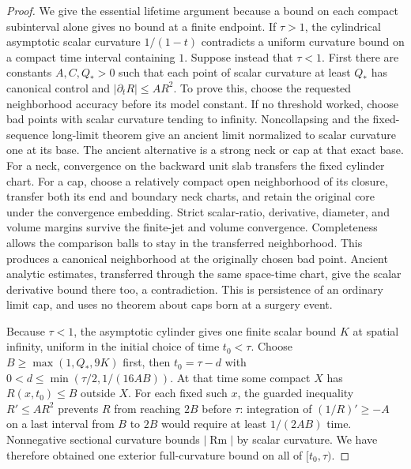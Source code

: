 \begin{proof}
We give the essential lifetime argument because a bound on each compact
subinterval alone gives no bound at a finite endpoint.  If $\tau>1$,
the cylindrical asymptotic scalar curvature $1/(1-t)$ contradicts a
uniform curvature bound on a compact time interval containing $1$.
Suppose instead that $\tau<1$.  First there are constants $A,C,Q_*>0$
such that each point of scalar curvature at least $Q_*$ has canonical
control and $|\partial_tR|\leq AR^2$.  To prove this, choose the
requested neighborhood accuracy before its model constant.  If no
threshold worked, choose bad points with scalar curvature tending to
infinity.  Noncollapsing and the fixed-sequence long-limit theorem
give an ancient limit normalized to scalar curvature one at its base.
The ancient alternative is a strong neck or cap at that exact base.
For a neck, convergence on the backward unit slab transfers the
fixed cylinder chart.  For a cap, choose a relatively compact open
neighborhood of its closure, transfer both its end and boundary
neck charts, and retain the original core under the convergence
embedding.  Strict scalar-ratio, derivative, diameter, and volume
margins survive the finite-jet and volume convergence.  Completeness
allows the comparison balls to stay in the transferred neighborhood.
This produces a canonical neighborhood at the originally chosen
bad point.  Ancient analytic estimates, transferred through the
same space-time chart, give the scalar derivative bound there too,
a contradiction.  This is persistence of an ordinary limit cap,
and uses no theorem about caps born at a surgery event.

Because $\tau<1$, the asymptotic cylinder gives one finite scalar
bound $K$ at spatial infinity, uniform in the initial choice of
time $t_0<\tau$.  Choose $B\geq\max(1,Q_*,9K)$ first, then
$t_0=\tau-d$ with $0<d\leq\min(\tau/2,1/(16AB))$.
At that time some compact $X$ has $R(x,t_0)\leq B$ outside $X$.
For each fixed such $x$, the guarded inequality $R'\leq AR^2$
prevents $R$ from reaching $2B$ before $\tau$: integration of
$(1/R)'\geq-A$ on a last interval from $B$ to $2B$ would require
at least $1/(2AB)$ time.  Nonnegative sectional curvature bounds
$|\operatorname{Rm}|$ by scalar curvature.  We have therefore
obtained one exterior full-curvature bound on all of $[t_0,\tau)$.


\end{proof}
